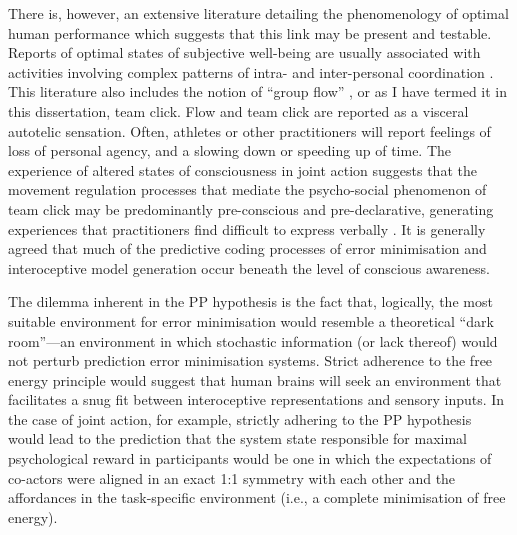 There is, however, an extensive literature detailing the phenomenology of optimal human performance which suggests that this link may be present and testable.
Reports of optimal states of subjective well-being are usually associated with activities involving complex patterns of intra- and inter-personal coordination \citep{Jackson1996}. This literature also includes the notion of ``group flow'' \citep{Sawyer2006,Noy2015}, or as I have termed it in this dissertation, team click.
Flow and team click are reported as a visceral autotelic sensation.  Often, athletes or other practitioners will report feelings of loss of personal agency, and a slowing down or speeding up of time.  The experience of altered states of consciousness in joint action suggests that the movement regulation processes that mediate the psycho-social phenomenon of team click may be predominantly pre-conscious and pre-declarative, generating experiences that practitioners find  difficult to express verbally \citep{Jackson1996,Semin2008,Rufi2015}. It is generally agreed that much of the predictive coding processes of error minimisation and interoceptive model generation occur beneath the level of conscious awareness\citep{Frith2007,Clark2013}.


The dilemma inherent in the PP hypothesis is the fact that, logically, the most suitable environment for error minimisation would resemble a theoretical ``dark room''---an environment in which stochastic information (or lack thereof) would not perturb prediction error minimisation systems\citep{Little2013}.  Strict adherence to the free energy principle would suggest that human brains will seek an environment that facilitates a snug fit between interoceptive representations and sensory inputs.  In the case of joint action, for example, strictly adhering to the PP hypothesis would lead to the prediction that the system state responsible for maximal psychological reward in participants would be one in which the expectations of co-actors were aligned in an exact 1:1 symmetry with each other and the affordances in the task-specific environment (i.e., a complete minimisation of free energy).

